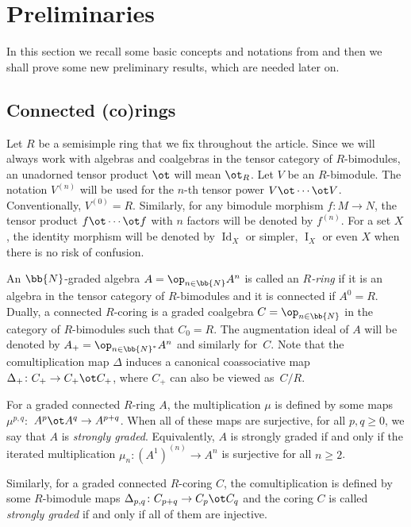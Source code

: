 \section{Preliminaries}\label{section2}
In this section we recall some basic concepts and notations from \cite{jps} and then we shall prove some new preliminary results, which are needed later on.
	
\subsection{Connected (co)rings} \label{corings} Let $R$ be a semisimple ring that we f\/ix throughout the article. Since we will always work with algebras and coalgebras in the tensor category of $R$-bimodules, an unadorned tensor product $\ot$ will mean $\ot_R$. Let $V$ be an $R$-bimodule. The notation $V^{(n)}$ will be used for the $n$-th tensor power $V \ot \cdots \ot V$. Conventionally, $V^{(0)} = R$. Similarly, for any bimodule morphism $f\colon M \to N$, the tensor product $f \ot \cdots \ot f$ with $n$ factors will be denoted by $f^{(n)}$. For a set $X$, the identity morphism will be denoted by $\operatorname{Id}_X$ or simpler, $\operatorname{I}_X$ or even $X$ when there is no risk of confusion.

An $\bb{N}$-graded algebra $A = \op_{n \in \bb{N}} A^n$ is called an \emph{$R$-ring} if it is an algebra in the tensor category of $R$-bimodules and it is connected if $A^0=R$. Dually, a connected $R$-coring is a graded coalgebra $C = \op_{n \in \bb{N}}$ in the category of $R$-bimodules such that $C_0=R$. The augmentation ideal of $A$ will be denoted by $A_+ = \op_{n \in \bb{N}^\ast} A^n$ and similarly for~$C$. Note that the comultiplication map $\Delta$ induces a canonical coassociative map $\Delta_+ \colon C_+ \to C_+ \ot C_+$, where $C_+$ can also be viewed as~$C/R$.

For a graded connected $R$-ring $A$, the multiplication $\mu$ is def\/ined by some maps $\mu^{p,q} \colon$ \mbox{$A^p \ot A^q \to A^{p+q}$}. When all of these maps are surjective, for all $p,q \geq 0$, we say that $A$ is \emph{strongly graded}. Equivalently, $A$ is strongly graded if and only if the iterated multiplication $\mu_n \colon (A^1)^{(n)} \to A^n$ is surjective for all $n \geq 2$.

Similarly, for a graded connected $R$-coring $C$, the comultiplication is def\/ined by some $R$-bimodule maps $\Delta_{p,q} \colon C_{p+q} \to C_p \ot C_q$ and the coring $C$ is called \emph{strongly graded} if and only if all of them are injective.

